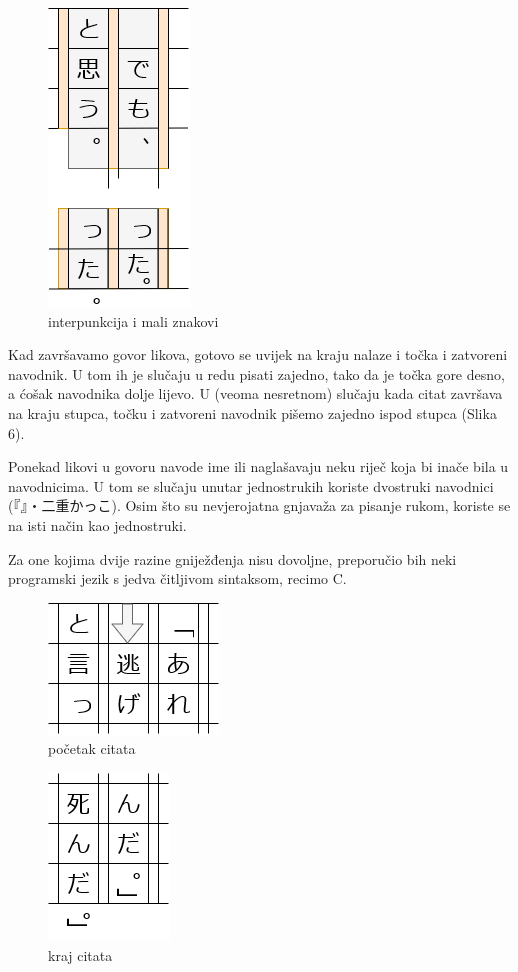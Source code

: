 	\begin{figure}
		\centering
		\includegraphics[width=.15\textwidth]{017_pisanje_res/a5.png}
		\caption{\centering interpunkcija i mali znakovi}
	\end{figure}

	Kad završavamo govor likova, gotovo se uvijek na kraju nalaze i točka i zatvoreni navodnik. U tom ih je slučaju u redu pisati zajedno, tako da je točka gore desno, a ćošak navodnika dolje lijevo. U (veoma nesretnom) slučaju kada citat završava na kraju stupca, točku i zatvoreni navodnik pišemo zajedno ispod stupca (Slika 6).
	
	Ponekad likovi u govoru navode ime ili naglašavaju neku riječ koja bi inače bila u navodnicima. U tom se slučaju unutar jednostrukih koriste dvostruki navodnici\\ (『』・二重かっこ). Osim što su nevjerojatna gnjavaža za pisanje rukom, koriste se na isti način kao jednostruki.
	
	Za one kojima dvije razine gniježđenja nisu dovoljne, preporučio bih neki programski jezik s jedva čitljivom sintaksom, recimo C.
	
	\begin{figure}
		\centering
		\includegraphics[width=.2\textwidth]{017_pisanje_res/b1.png}
		\caption{početak citata}
	\end{figure}
	\begin{figure}
		\centering
		\includegraphics[width=.16\textwidth]{017_pisanje_res/b2.png}
		\caption{kraj citata}
	\end{figure}

